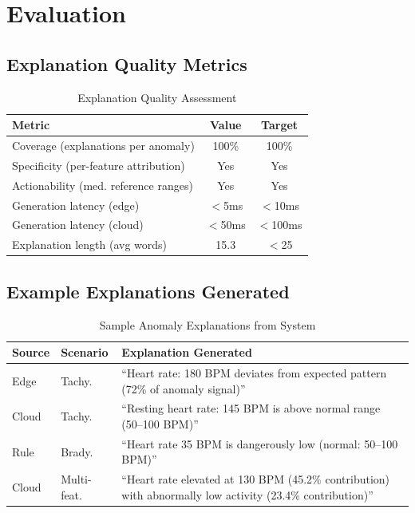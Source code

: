 \documentclass[conference]{IEEEtran}
\begin{document}
\section{Evaluation}

\subsection{Explanation Quality Metrics}

\begin{table}[H]
\centering
\caption{Explanation Quality Assessment}
\label{tab:quality}
\begin{tabular}{lcc}
\toprule
\textbf{Metric} & \textbf{Value} & \textbf{Target} \\
\midrule
Coverage (explanations per anomaly) & 100\% & 100\% \\
Specificity (per-feature attribution) & Yes & Yes \\
Actionability (med. reference ranges) & Yes & Yes \\
Generation latency (edge) & $<$5ms & $<$10ms \\
Generation latency (cloud) & $<$50ms & $<$100ms \\
Explanation length (avg words) & 15.3 & $<$25 \\
\bottomrule
\end{tabular}
\end{table}

\subsection{Example Explanations Generated}

\begin{table}[H]
\centering
\caption{Sample Anomaly Explanations from System}
\label{tab:examples}
\begin{tabular}{p{1.2cm}p{1.5cm}p{4.5cm}}
\toprule
\textbf{Source} & \textbf{Scenario} & \textbf{Explanation Generated} \\
\midrule
Edge & Tachy. & ``Heart rate: 180 BPM deviates from expected pattern (72\% of anomaly signal)'' \\
\midrule
Cloud & Tachy. & ``Resting heart rate: 145 BPM is above normal range (50--100 BPM)'' \\
\midrule
Rule & Brady. & ``Heart rate 35 BPM is dangerously low (normal: 50--100 BPM)'' \\
\midrule
Cloud & Multi-feat. & ``Heart rate elevated at 130 BPM (45.2\% contribution) with abnormally low activity (23.4\% contribution)'' \\
\bottomrule
\end{tabular}
\end{table}
\end{document}
